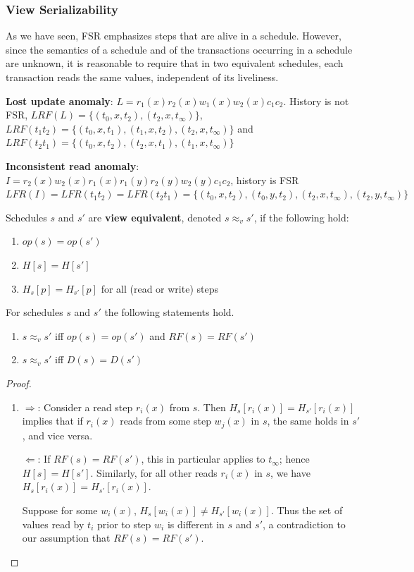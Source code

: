 \documentclass[11pt]{article}
\begin{document}
\subsubsection{View Serializability}
\label{sec:org10d71af}
As we have seen, FSR emphasizes steps that are alive in a schedule. However, since the semantics
of a schedule and of the transactions occurring in a schedule are unknown, it is reasonable to
require that in two equivalent schedules, each transaction reads the same values, independent of
its liveliness.

\textbf{Lost update anomaly}: \(L=r_1(x)r_2(x)w_1(x)w_2(x)c_1c_2\). History is not
FSR,
 \(LRF(L)=\{(t_0,x,t_2),(t_2,x,t_\infty)\}\),
 \(LRF(t_1t_2)=\{(t_0,x,t_1),(t_1,x,t_2),(t_2,x,t_\infty)\}\) and
 \(LRF(t_2t_1)=\{(t_0,x,t_2),(t_2,x,t_1),(t_1,x,t_\infty)\}\)


\textbf{Inconsistent read anomaly}: \(I=r_2(x)w_2(x)r_1(x)r_1(y)r_2(y)w_2(y)c_1c_2\), history is FSR
\(LFR(I)=LFR(t_1t_2)=LFR(t_2t_1)=\{(t_0,x,t_2),(t_0,y,t_2),(t_2,x,t_\infty),(t_2,y,t_\infty)\}\)


\begin{definition}
Schedules \(s\) and \(s'\) are \textbf{view equivalent}, denoted \(s\approx_vs'\), if the following
hold:
\begin{enumerate}
\item \(op(s)=op(s')\)
\item \(H[s]=H[s']\)
\item \(H_s[p]=H_{s'}[p]\) for all (read or write) steps
\end{enumerate}
\end{definition}

\begin{theorem}[]
For schedules \(s\) and \(s'\) the following statements hold.
\begin{enumerate}
\item \(s\approx_v s'\) iff \(op(s)=op(s')\) and \(RF(s)=RF(s')\)
\item \(s\approx_vs'\) iff \(D(s)=D(s')\)
\end{enumerate}
\end{theorem}

\begin{proof}
\begin{enumerate}
\item \(\Rightarrow\): Consider a read step \(r_i(x)\) from \(s\).
Then \(H_s[r_i(x)]=H_{s'}[r_i(x)]\) implies that if \(r_i(x)\) reads from some
step \(w_j(x)\) in \(s\), the same holds in \(s'\), and vice versa.

\(\Leftarrow\): If \(RF(s)=RF(s')\), this in particular applies to \(t_\infty\);
hence \(H[s]=H[s']\). Similarly, for all other reads \(r_i(x)\) in \(s\), we
have \(H_s[r_i(x)]=H_{s'}[r_i(x)]\).

Suppose for some \(w_i(x)\), \(H_s[w_i(x)]\neq H_{s'}[w_i(x)]\). Thus the set of values read
by \(t_i\) prior to step \(w_i\) is different in \(s\) and \(s'\), a contradiction to our
assumption that \(RF(s)=RF(s')\).
\end{enumerate}
\end{proof}
\end{document}
